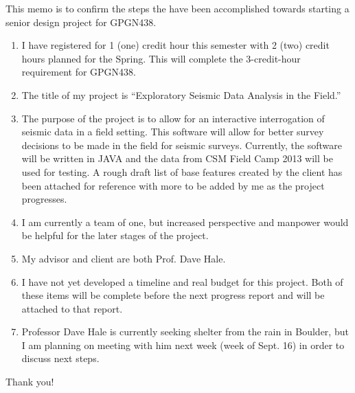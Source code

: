 \documentclass[a4paper,11pt]{texMemo}
\begin{document}
\maketitle

This memo is to confirm the steps the have been accomplished towards starting a senior design project for GPGN438. \\

\begin{enumerate}
 \item I have registered for 1 (one) credit hour this semester with 2 (two) credit hours planned for the Spring. This will complete the 3-credit-hour requirement for GPGN438. 
 
 \item The title of my project is ``Exploratory Seismic Data Analysis in the Field.''
 
 \item The purpose of the project is to allow for an interactive interrogation of seismic data in a field setting. This software will allow for better survey decisions to be made in the field for seismic surveys. Currently, the software will be written in JAVA and the data from CSM Field Camp 2013 will be used for testing. A rough draft list of base features created by the client has been attached for reference with more to be added by me as the project progresses.
 
 \item I am currently a team of one, but increased perspective and manpower would be helpful for the later stages of the project. 
 
 \item My advisor and client are both Prof. Dave Hale.
 
 \item I have not yet developed a timeline and real budget for this project. Both of these items will be complete before the next progress report and will be attached to that report. 
 
 \item Professor Dave Hale is currently seeking shelter from the rain in Boulder, but I am planning on meeting with him next week (week of Sept. 16) in order to discuss next steps.
\end{enumerate}

Thank you!

\newpage
\end{document}
